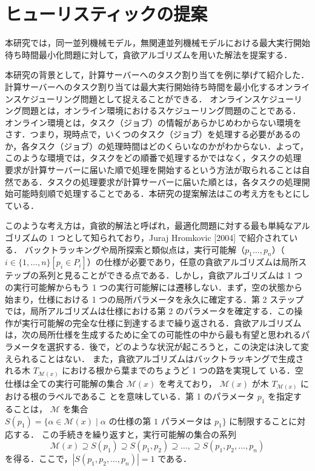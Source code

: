 \documentclass[12pt]{optlab-bachelor}
\begin{document}
\section{ヒューリスティックの提案}\label{5_s_1}
本研究では，同一並列機械モデル，無関連並列機械モデルにおける最大実行開始待ち時間最小化問題に対して，貪欲アルゴリズムを用いた解法を提案する．

本研究の背景として，計算サーバーへのタスク割り当てを例に挙げて紹介した．
計算サーバーへのタスク割り当ては最大実行開始待ち時間を最小化するオンラインスケジューリング問題として捉えることができる．
オンラインスケジューリング問題とは，オンライン環境におけるスケジューリング問題のことである．
オンライン環境とは，タスク（ジョブ）の情報があらかじめわからない環境を
さす．つまり，現時点で，いくつのタスク（ジョブ）を処理する必要があるの
か，各タスク（ジョブ）の処理時間はどのくらいなのかがわからない．よって，
このような環境では，タスクをどの順番で処理するかではなく，タスクの処理
要求が計算サーバーに届いた順で処理を開始するという方法が取られることは自然である．タスクの処理要求が計算サーバーに届いた順とは，各タスクの処理開始可能時刻順で処理することである．本研究の提案解法はこの考え方をもとにしている．

このような考え方は，貪欲的解法と呼ばれ，最適化問題に対する最も単純なアルゴリズムの 1 つとして知られており，Juraj Hromkovic [2004] \cite{greedy} で紹介されている．
バックトラッキングや局所探索と類似点は，実行可能解（$p_1\ldots,p_n$）（$i \in \{1,\ldots,n\}[p_i \in P_i]$）の仕様が必要であり，任意の貪欲アルゴリズムは局所ステップの系列と見ることができる点である．しかし，貪欲アルゴリズムは 1 つの実行可能解からもう 1 つの実行可能解には遷移しない．まず，空の状態から始まり，仕様における 1 つの局所パラメータを永久に確定する．第 2 ステップでは，局所アルゴリズムは仕様における第 2 のパラメータを確定する．この操作が実行可能解の完全な仕様に到達するまで繰り返される．貪欲アルゴリズムは，次の局所仕様を生成するために全ての可能性の中から最も有望と思われるパラメータを選択する．後で，どのような状況が起ころうと，この決定は決して変えられることはない．
また，貪欲アルゴリズムはバックトラッキングで生成される木
$T_{\mathcal{M}(x)}$ における根から葉までのちょうど 1 つの路を実現して
いる．空仕様は全ての実行可能解の集合 $\mathcal{M}(x)$ を考えており，
$\mathcal{M}(x)$ が木 $T_{\mathcal{M}(x)}$ における根のラベルであるこ
とを意味している．第 1 のパラメータ $p_1$ を指定することは，
$\mathcal{M}$ を集合 $S(p_1) = \{\alpha \in \mathcal{M}(x) \mid \alpha
\text{ の仕様の第 1 パラメータは } p_1\}$ に制限することに対応する．
この手続きを繰り返すと，実行可能解の集合の系列
$$\mathcal{M}(x) \supseteq S(p_1) \supseteq S(p_1,p_2) \supseteq
\ldots, \supseteq S(p_1,p_2,\ldots,p_n)$$
を得る．ここで，$|S(p_1,p_2,\ldots,p_n)| = 1$ である．\\
\end{document}

